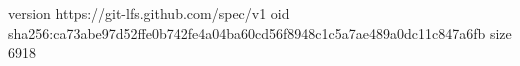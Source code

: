 version https://git-lfs.github.com/spec/v1
oid sha256:ca73abe97d52ffe0b742fe4a04ba60cd56f8948c1c5a7ae489a0dc11c847a6fb
size 6918

